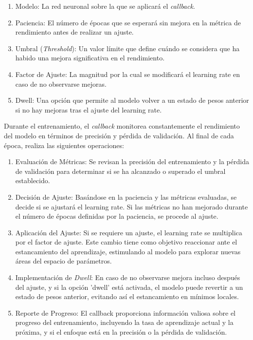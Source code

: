 \begin{enumerate}
   \item Modelo: La red neuronal sobre la que se aplicará el \textit{callback}.
   \item Paciencia: El número de épocas que se esperará sin mejora en la métrica de rendimiento antes de realizar un ajuste.
   \item Umbral (\textit{Threshold}): Un valor límite que define cuándo se considera que ha habido una mejora significativa en el rendimiento.
   \item Factor de Ajuste: La magnitud por la cual se modificará el learning rate en caso de no observarse mejoras.
   \item Dwell: Una opción que permite al modelo volver a un estado de pesos anterior si no hay mejoras tras el ajuste del learning rate.
\end{enumerate}

Durante el entrenamiento, el \textit{callback} monitorea constantemente el rendimiento del modelo en términos de precisión y pérdida de validación. Al final de cada época, realiza las siguientes operaciones:

\begin{enumerate}
   \item Evaluación de Métricas: Se revisan la precisión del entrenamiento y la pérdida de validación para determinar si se ha alcanzado o superado el umbral establecido.
   \item Decisión de Ajuste: Basándose en la paciencia y las métricas evaluadas, se decide si se ajustará el learning rate. Si las métricas no han mejorado durante el número de épocas definidas por la paciencia, se procede al ajuste.
   \item Aplicación del Ajuste: Si se requiere un ajuste, el learning rate se multiplica por el factor de ajuste. Este cambio tiene como objetivo reaccionar ante el estancamiento del aprendizaje, estimulando al modelo para explorar nuevas áreas del espacio de parámetros.
   \item Implementación de \textit{Dwell}: En caso de no observarse mejora incluso después del ajuste, y si la opción 'dwell' está activada, el modelo puede revertir a un estado de pesos anterior, evitando así el estancamiento en mínimos locales.
   \item Reporte de Progreso: El callback proporciona información valiosa sobre el progreso del entrenamiento, incluyendo la tasa de aprendizaje actual y la próxima, y si el enfoque está en la precisión o la pérdida de validación.
\end{enumerate}